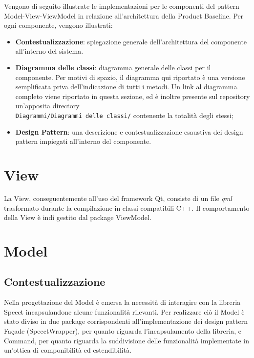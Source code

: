 \documentclass[openany,12pt,a4paper]{report}
\begin{document}
	Vengono di seguito illustrate le implementazioni per le componenti del pattern Model-View-ViewModel in relazione all'architettura della Product Baseline. Per ogni componente, vengono illustrati:
	
	\begin{itemize}
		\item \textbf{Contestualizzazione}: spiegazione generale dell'architettura del componente all'interno del sistema.
		\item \textbf{Diagramma delle classi}: diagramma generale delle classi per il componente. Per motivi di spazio, il diagramma qui riportato è una versione semplificata priva dell'indicazione di tutti i metodi. Un link al diagramma completo viene riportato in questa sezione, ed è inoltre presente sul repository un'apposita directory \\ \verb|Diagrammi/Diagrammi delle classi/| contenente la totalità degli stessi;
		\item \textbf{Design Pattern}: una descrizione e contestualizzazione esaustiva dei design pattern impiegati all'interno del componente.
	\end{itemize} 
	
	\section{View}
	
	La View, conseguentemente all’uso del framework Qt, consiste di un file \textit{qml} trasformato durante la compilazione in classi compatibili C++. Il comportamento della View è indi gestito dal package ViewModel. 
	
	\section{Model}
	
	\subsection{Contestualizzazione}
	
	Nella progettazione del Model è emersa la necessità di interagire con la libreria Speect incapsulandone alcune funzionalità rilevanti. Per realizzare ciò il Model è stato diviso in due package corrispondenti all'implementazione dei design pattern Façade (SpeectWrapper), per quanto riguarda l'incapsulamento della libreria, e Command, per quanto riguarda la suddivisione delle funzionalità implementate in un'ottica di componibilità ed estendibilità.  
	
\end{document}
